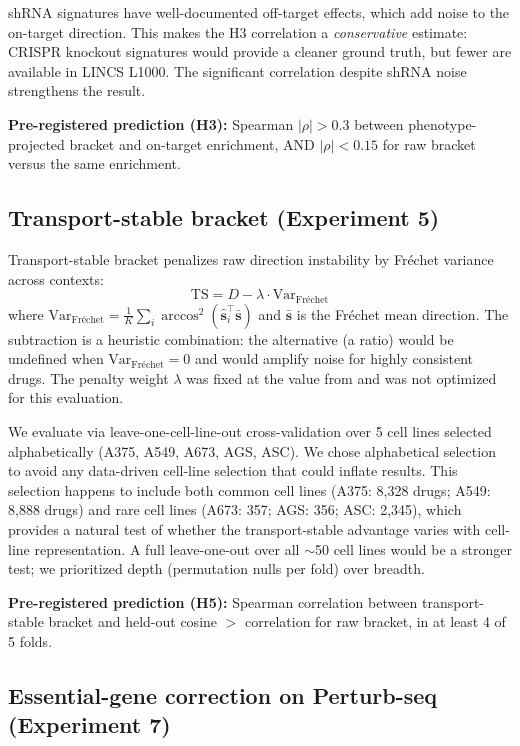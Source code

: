 \documentclass{article}
\begin{document}
shRNA signatures have well-documented off-target effects, which add noise
to the on-target direction. This makes the H3 correlation a
\emph{conservative} estimate: CRISPR knockout signatures would provide a
cleaner ground truth, but fewer are available in LINCS L1000. The
significant correlation despite shRNA noise strengthens the result.

\textbf{Pre-registered prediction (H3):} Spearman $|\rho| > 0.3$ between
phenotype-projected bracket and on-target enrichment, AND $|\rho| < 0.15$
for raw bracket versus the same enrichment.

\subsection{Transport-stable bracket (Experiment 5)}

Transport-stable bracket penalizes raw direction instability by Fr\'{e}chet
variance across contexts:
\begin{equation}
  \text{TS} = D - \lambda \cdot \text{Var}_{\text{Fr\'echet}}
  \label{eq:ts}
\end{equation}
where $\text{Var}_{\text{Fr\'echet}} = \frac{1}{K}\sum_i
\arccos^2(\hat{\mathbf{s}}_i^\top \bar{\mathbf{s}})$ and
$\bar{\mathbf{s}}$ is the Fr\'echet mean direction. The subtraction is a
heuristic combination: the alternative (a ratio) would be undefined when
$\text{Var}_{\text{Fr\'echet}} = 0$ and would amplify noise for highly
consistent drugs. The penalty weight $\lambda$ was fixed at the value from
\citet{tower2026bracket} and was not optimized for this evaluation.

We evaluate via leave-one-cell-line-out cross-validation over 5 cell lines
selected alphabetically (A375, A549, A673, AGS, ASC). We chose alphabetical
selection to avoid any data-driven cell-line selection that could inflate
results. This selection happens to include both common cell lines (A375:
8{,}328 drugs; A549: 8{,}888 drugs) and rare cell lines (A673: 357; AGS:
356; ASC: 2{,}345), which provides a natural test of whether the
transport-stable advantage varies with cell-line representation. A full
leave-one-out over all $\sim$50 cell lines would be a stronger test;
we prioritized depth (permutation nulls per fold) over breadth.

\textbf{Pre-registered prediction (H5):} Spearman correlation between
transport-stable bracket and held-out cosine $>$ correlation for raw bracket,
in at least 4 of 5 folds.

\subsection{Essential-gene correction on Perturb-seq (Experiment 7)}
\end{document}
